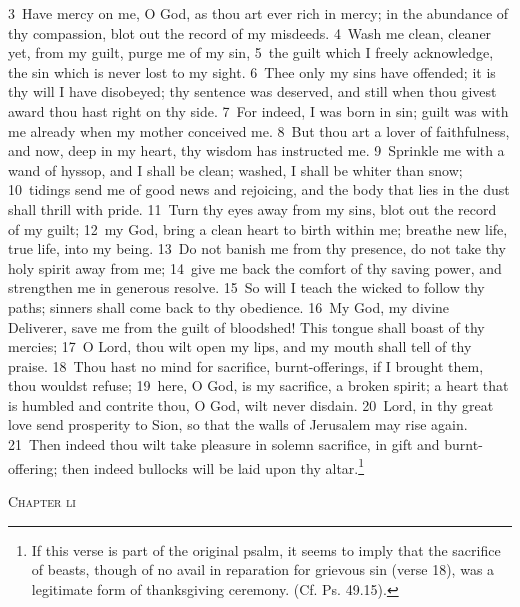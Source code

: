 \documentclass[10pt]{book} %
\begin{document}
\textcolor{benred8}{3}~Have mercy on me, O God, as thou art ever rich in mercy; in the abundance of thy compassion, blot out the record of my misdeeds. \textcolor{benred8}{4}~Wash me clean, cleaner yet, from my guilt, purge me of my sin, \textcolor{benred8}{5}~the guilt which I freely acknowledge, the sin which is never lost to my sight. \textcolor{benred8}{6}~Thee only my sins have offended; it is thy will I have disobeyed; thy sentence was deserved, and still when thou givest award thou hast right on thy side. \textcolor{benred8}{7}~For indeed, I was born in sin; guilt was with me already when my mother conceived me. \textcolor{benred8}{8}~But thou art a lover of faithfulness, and now, deep in my heart, thy wisdom has instructed me. \textcolor{benred8}{9}~Sprinkle me with a wand of hyssop, and I shall be clean; washed, I shall be whiter than snow; \textcolor{benred8}{10}~tidings send me of good news and rejoicing, and the body that lies in the dust shall thrill with pride.
\textcolor{benred8}{11}~Turn thy eyes away from my sins, blot out the record of my guilt; \textcolor{benred8}{12}~my God, bring a clean heart to birth within me; breathe new life, true life, into my being. \textcolor{benred8}{13}~Do not banish me from thy presence, do not take thy holy spirit away from me; \textcolor{benred8}{14}~give me back the comfort of thy saving power, and strengthen me in generous resolve. \textcolor{benred8}{15}~So will I teach the wicked to follow thy paths; sinners shall come back to thy obedience. \textcolor{benred8}{16}~My God, my divine Deliverer, save me from the guilt of bloodshed! This tongue shall boast of thy mercies; \textcolor{benred8}{17}~O Lord, thou wilt open my lips, and my mouth shall tell of thy praise. \textcolor{benred8}{18}~Thou hast no mind for sacrifice, burnt-offerings, if I brought them, thou wouldst refuse; \textcolor{benred8}{19}~here, O God, is my sacrifice, a broken spirit; a heart that is humbled and contrite thou, O God, wilt never disdain. \textcolor{benred8}{20}~Lord, in thy great love send prosperity to Sion, so that the walls of Jerusalem may rise again. \textcolor{benred8}{21}~Then indeed thou wilt take pleasure in solemn sacrifice, in gift and burnt-offering; then indeed bullocks will be laid upon thy altar.\footnote[1]{If this verse is part of the original psalm, it seems to imply that the sacrifice of beasts, though of no avail in reparation for grievous sin (verse 18), was a legitimate form of thanksgiving ceremony. (Cf. Ps. 49.15).}
\begin{large}\begin{center}\textsc{Chapter li}\end{center}\end{large}
\end{document}
